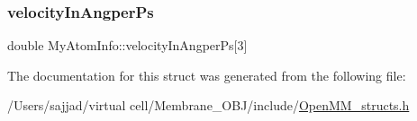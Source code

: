 \mbox{\label{structMyAtomInfo_a48cc3013502c5229b91779046e5f9a68}} 
\subsubsection{\texorpdfstring{velocityInAngperPs}{velocityInAngperPs}}
{\footnotesize\ttfamily double My\+Atom\+Info\+::velocity\+In\+Angper\+Ps\mbox{[}3\mbox{]}}



The documentation for this struct was generated from the following file\+:\begin{DoxyCompactItemize}
\item 
/\+Users/sajjad/virtual cell/\+Membrane\+\_\+\+O\+B\+J/include/\mbox{\hyperlink{OpenMM__structs_8h}{Open\+M\+M\+\_\+structs.\+h}}\end{DoxyCompactItemize}
